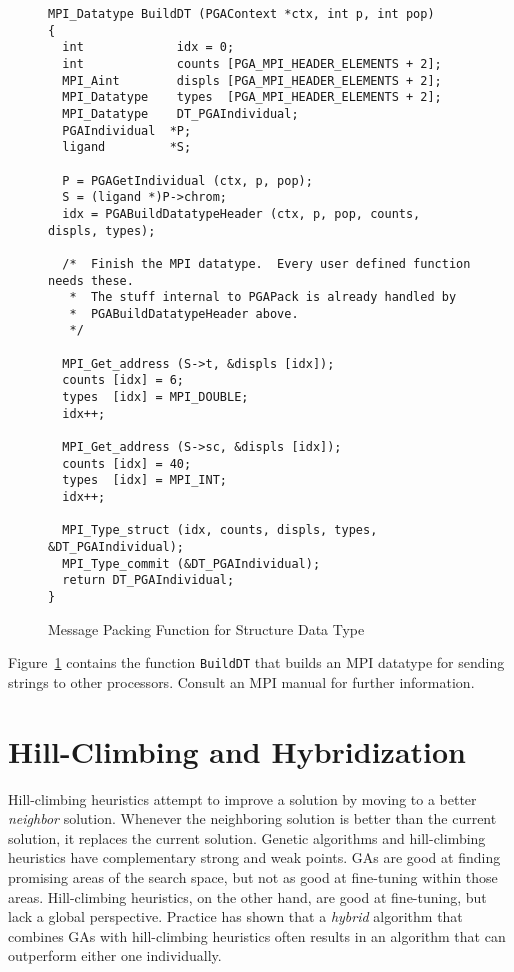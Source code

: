 \documentclass{report}
\begin{document}
\begin{figure}
\begin{verbatim}
MPI_Datatype BuildDT (PGAContext *ctx, int p, int pop)
{
  int             idx = 0;
  int             counts [PGA_MPI_HEADER_ELEMENTS + 2];
  MPI_Aint        displs [PGA_MPI_HEADER_ELEMENTS + 2];
  MPI_Datatype    types  [PGA_MPI_HEADER_ELEMENTS + 2];
  MPI_Datatype    DT_PGAIndividual;
  PGAIndividual  *P;
  ligand         *S;

  P = PGAGetIndividual (ctx, p, pop);
  S = (ligand *)P->chrom;
  idx = PGABuildDatatypeHeader (ctx, p, pop, counts, displs, types);

  /*  Finish the MPI datatype.  Every user defined function needs these.
   *  The stuff internal to PGAPack is already handled by
   *  PGABuildDatatypeHeader above.
   */

  MPI_Get_address (S->t, &displs [idx]);
  counts [idx] = 6;
  types  [idx] = MPI_DOUBLE;
  idx++;

  MPI_Get_address (S->sc, &displs [idx]);
  counts [idx] = 40;
  types  [idx] = MPI_INT;
  idx++;

  MPI_Type_struct (idx, counts, displs, types, &DT_PGAIndividual);
  MPI_Type_commit (&DT_PGAIndividual);
  return DT_PGAIndividual;
}
\end{verbatim}
\caption{Message Packing Function for Structure Data Type}
\label{example1:new-datatype-build}
\end{figure}

Figure~\ref{example1:new-datatype-build} contains the function \verb+BuildDT+
that builds an MPI datatype for sending strings to other processors.  Consult
an MPI manual for further information.


\chapter{Hill-Climbing and Hybridization}\label{chp:hill-climbing}

Hill-climbing heuristics attempt to improve a solution by moving to a better
{\em neighbor} solution.  Whenever the neighboring solution is better than the
current solution, it replaces the current solution.  Genetic algorithms and
hill-climbing heuristics have complementary strong and weak points.  GAs are
good at finding promising areas of the search space, but not as good at
fine-tuning within those areas.  Hill-climbing heuristics, on the other
hand, are good at fine-tuning, but lack a global perspective.  Practice has
shown that a {\em hybrid} algorithm that combines GAs with hill-climbing
heuristics often results in an algorithm that can outperform either one
individually.
\end{document}
